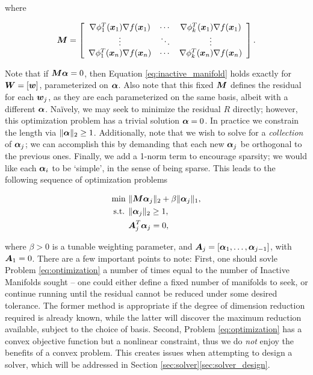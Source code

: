 \documentclass[]{aiaa-tc}%
\begin{document}
where

\begin{equation}
\label{eq:matrix_m}
\mM = \left[\begin{array}{ccc}%
    \nabla\phi_1^T(\vx_1)\nabla f(\vx_1) & \cdots & \nabla\phi_k^T(\vx_1)\nabla f(\vx_1) \\
    \vdots & \ddots & \vdots \\
    \nabla\phi_1^T(\vx_n)\nabla f(\vx_n) & \cdots & \nabla\phi_k^T(\vx_n)\nabla f(\vx_n) \\
    \end{array}\right].
\end{equation}

Note that if $\boldsymbol{M}\boldsymbol{\alpha}=0$, then Equation \ref{eq:inactive_manifold} holds exactly for $\boldsymbol{W}=[\boldsymbol{w}]$, parameterized on $\boldsymbol{\alpha}$. Also note that this fixed $\boldsymbol{M}$ defines the residual for each $\boldsymbol{w}_j$, as they are each parameterized on the same basis, albeit with a different $\boldsymbol{\alpha}$. Na{\"i}vely, we may seek to minimize the residual $R$ directly; however, this optimization problem has a trivial solution $\boldsymbol{\alpha}=0$. In practice we constrain the length via $\|\boldsymbol{\alpha}\|_2\geq1$. Additionally, note that we wish to solve for a \emph{collection} of $\boldsymbol{\alpha}_j$; we can accomplish this by demanding that each new $\boldsymbol{\alpha}_j$ be orthogonal to the previous ones. Finally, we add a 1-norm term to encourage sparsity; we would like each $\boldsymbol{\alpha}_i$ to be `simple', in the sense of being sparse. This leads to the following sequence of optimization problems

\begin{equation}
\begin{aligned}
\label{eq:optimization}
\text{min  }& \|\boldsymbol{M}\boldsymbol{\alpha}_j\|_2 + \beta\|\boldsymbol{\alpha}_j\|_1, \\
\text{s.t. }& \|\boldsymbol{\alpha}_j\|_2\geq1, \\
            & \boldsymbol{A}_j^T \boldsymbol{\alpha}_j = 0,
\end{aligned}
\end{equation}

where $\beta>0$ is a tunable weighting parameter, and $\boldsymbol{A}_j=[\boldsymbol{\alpha}_1,\dots,\boldsymbol{\alpha}_{j-1}]$, with $\boldsymbol{A}_1=0$. There are a few important points to note: First, one should sovle Problem \ref{eq:optimization} a number of times equal to the number of Inactive Manifolds sought -- one could either define a fixed number of manifolds to seek, or continue running until the residual cannot be reduced under some desired tolerance. The former method is appropriate if the degree of dimension reduction required is already known, while the latter will discover the maximum reduction available, subject to the choice of basis. Second, Problem \ref{eq:optimization} has a convex objective function but a nonlinear constraint, thus we do \emph{not} enjoy the benefits of a convex problem. This creates issues when attempting to design a solver, which will be addressed in Section \ref{sec:solver}\ref{sec:solver_design}.
\end{document}
